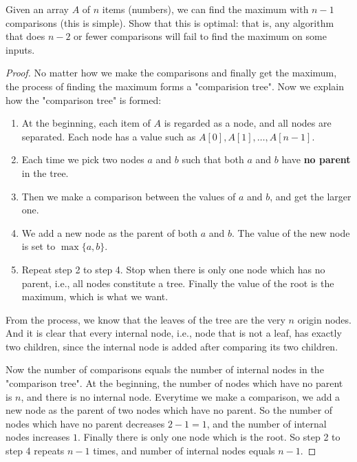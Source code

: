 


\maketitle

\begin{thm}{}{}
    Given an array $A$ of $n$ items (numbers), we can find the maximum with $n - 1$ comparisons (this is simple). Show that this is optimal: that is, any algorithm that does $n - 2$ or fewer comparisons will fail to find the maximum on some inputs.
\end{thm}

\begin{proof}
    No matter how we make the comparisons and finally get the maximum, the process of finding the maximum forms a "comparision tree". Now we explain how the "comparison tree" is formed:
    
    \begin{enumerate}
        \item At the beginning, each item of $A$ is regarded as a node, and all nodes are separated. Each node has a value such as $A[0], A[1], \ldots, A[n - 1]$.
        \item Each time we pick two nodes $a$ and $b$ such that both $a$ and $b$ have \textbf{no parent} in the tree.
        \item Then we make a comparison between the values of $a$ and $b$, and get the larger one. 
        \item We add a new node as the parent of both $a$ and $b$. The value of the new node is set to $\max\{a, b\}$.
        \item Repeat step 2 to step 4. Stop when there is only one node which has no parent, i.e., all nodes constitute a tree. Finally the value of the root is the maximum, which is what we want.
    \end{enumerate}
    
    From the process, we know that the leaves of the tree are the very $n$ origin nodes. And it is clear that every internal node, i.e., node that is not a leaf, has exactly two children, since the internal node is added after comparing its two children.
    
    Now the number of comparisons equals the number of internal nodes in the "comparison tree". At the beginning, the number of nodes which have no parent is $n$, and there is no internal node. Everytime we make a comparison, we add a new node as the parent of two nodes which have no parent. So the number of nodes which have no parent decreases $2 - 1 = 1$, and the number of internal nodes increases $1$. Finally there is only one node which is the root. So step 2 to step 4 repeats $n - 1$ times, and number of internal nodes equals $n - 1$.
    

\end{proof}
